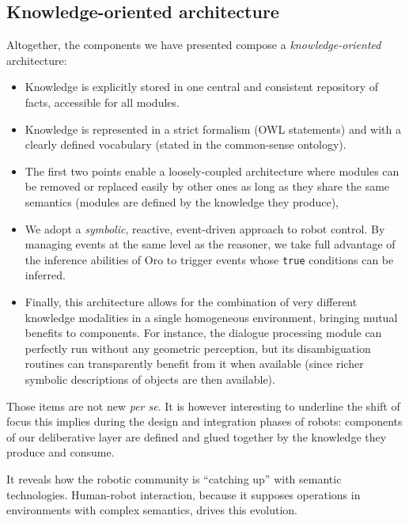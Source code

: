 \documentclass[preprint,3p,times]{elsarticle}
\begin{document}
\subsection{Knowledge-oriented architecture}

Altogether, the components we have presented compose a
\emph{knowledge-oriented} architecture:

\begin{itemize}
    
    \item{Knowledge is explicitly stored in one central and consistent
    repository of facts, accessible for all modules.} 

    \item{Knowledge is represented in a strict formalism (OWL statements) and
    with a clearly defined vocabulary (stated in the common-sense ontology).}

    \item{The first two points enable a loosely-coupled architecture where
    modules can be removed or replaced easily by other ones as long as
    they share the same semantics (modules are defined by the knowledge they
    produce),} 

    \item{We adopt a \emph{symbolic}, reactive, event-driven approach to robot control.
    By managing events at the same level as the reasoner, we take full
    advantage of the inference abilities of {\sc Oro} to trigger events whose
    \texttt{true} conditions can be inferred.} 

    \item{Finally, this architecture allows for the combination of very
    different knowledge modalities in a single homogeneous environment,
    bringing mutual benefits to components. For instance, the dialogue
    processing module can perfectly run without any geometric
    perception, but its disambiguation routines can transparently
    benefit from it when available (since richer symbolic descriptions of
    objects are then available).}

\end{itemize}

Those items are not new \emph{per se}. It is however interesting to
underline the shift of focus this implies during the design and integration
phases of robots: components of our deliberative layer are defined and glued together by
the knowledge they produce and consume.

It reveals how the robotic community is ``catching up'' with semantic
technologies. Human-robot interaction, because it supposes operations in
environments with complex semantics, drives this evolution.
\end{document}
